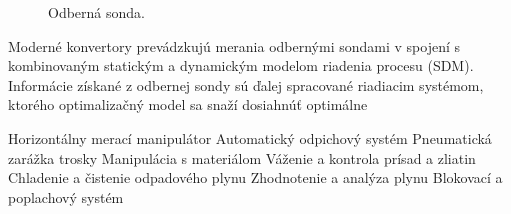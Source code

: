 \documentclass[]{tukediphc}
\begin{document}
\begin{figure}[!ht]
	\centering
	\qquad
	\caption{Odberná sonda.}
	\label{o:21}
\end{figure}

Moderné konvertory prevádzkujú merania odbernými sondami v spojení s kombinovaným statickým a dynamickým modelom riadenia procesu (SDM).
Informácie získané z odbernej sondy sú ďalej spracované riadiacim systémom, ktorého optimalizačný model sa snaží dosiahnúť optimálne 

Horizontálny merací manipulátor
Automatický odpichový systém
Pneumatická zarážka trosky
Manipulácia s materiálom
Váženie a kontrola prísad a zliatin
Chladenie a čistenie odpadového plynu
Zhodnotenie a analýza plynu
Blokovací a poplachový systém



%

%
\end{document}

